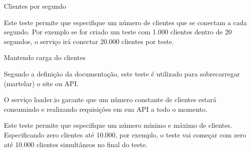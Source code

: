   Clientes por segundo
  
  Este teste permite que especifique um número de clientes que se conectam a cada segundo. Por exemplo se for criado
  um teste com 1.000 clientes dentro de 20 segundos, o serviço irá conectar 20.000 clientes por teste.
  
  Mantendo carga do clientes
  
  Segundo a definição da documentação, este teste é utilizado para sobrecarregar (martelar) o site ou \ac{API}.
  
  O serviço loader.io garante que um número constante de clientes estará consumindo e realizando requisições em 
  sua \ac{API} a todo o momento.
  
  Este teste permite que especifique um número mínimo e máximo de clientes. Especificando zero clientes
  até 10.000, por exemplo, o teste vai começar com zero até 10.000 clientes simultâneos no final do teste.
  
